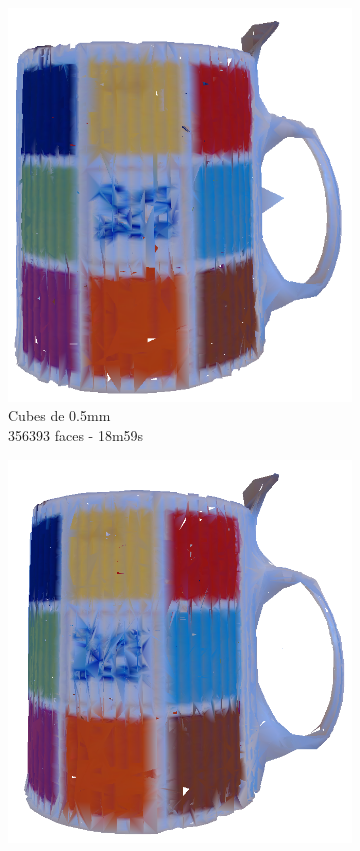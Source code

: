 \documentclass[a4paper,10pt]{report}
\begin{document}
\begin{figure}[h!]
	\centering
    \begin{subfigure}[b]{0.3\textwidth}
	    \includegraphics[width=\textwidth]{results/vs05-ipd.png}
        \caption{Cubes de 0.5mm\\356393 faces - 18m59s}
    \end{subfigure}
    \begin{subfigure}[b]{0.3\textwidth}
	    \includegraphics[width=\textwidth]{results/vs1-ipd.png}

\end{subfigure}
\end{figure}
\end{document}
